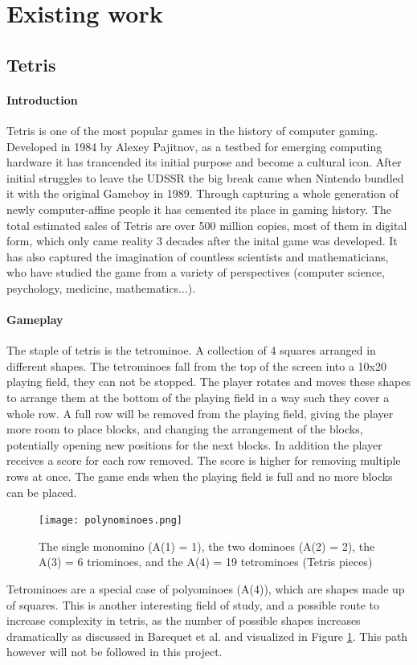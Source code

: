 \documentclass{article}
\begin{document}
\section{Existing work}
\subsection{Tetris}
\paragraph{Introduction}
Tetris is one of the most popular games in the history of computer gaming. Developed in 1984 by Alexey Pajitnov, as a testbed for emerging computing hardware it has trancended its initial purpose and become a cultural icon. 
After initial struggles to leave the UDSSR the big break came when Nintendo bundled it with the original Gameboy in 1989. 
Through capturing a whole generation of newly computer-affine people it has cemented its place in gaming history. The total estimated sales of Tetris are over 500 million copies, most of them in digital form, which only came reality 3 decades after the inital game was developed.
It has also captured the imagination of countless scientists and mathematicians, who have studied the game from a variety of perspectives (computer science, psychology, medicine, mathematics...).
\paragraph{Gameplay}
The staple of tetris is the tetrominoe. A collection of 4 squares arranged in different shapes. The tetrominoes fall from the top of the screen into a 10x20 playing field, they can not be stopped. The player rotates and moves these shapes to arrange them at the bottom of the playing field in a way such they cover a whole row. A full row will be removed from the playing field, giving the player more room to place blocks, and changing the arrangement of the blocks, potentially opening new positions for the next blocks.
In addition the player receives a score for each row removed. The score is higher for removing multiple rows at once. The game ends when the playing field is full and no more blocks can be placed.
\begin{figure}
    \label{fig:poly}
    \centering
    \texttt{[image: polynominoes.png]}
    \caption{The single monomino (A(1) = 1),
    the two dominoes (A(2) = 2), the A(3) = 6
    triominoes, and the A(4) = 19 tetrominoes
    (Tetris pieces) \cite{polyominoes}}  
\end{figure}
Tetrominoes are a special case of polyominoes (A(4)), which are shapes made up of squares. This is another interesting field of study, and a possible route to increase complexity in tetris, as the number of possible shapes increases dramatically as discussed in Barequet et al.\cite{polyominoes} and visualized in Figure \ref{fig:poly}.
This path however will not be followed in this project.
\end{document}
